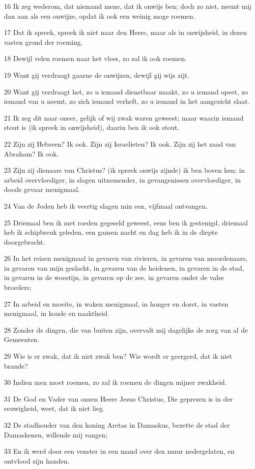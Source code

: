 \par 16 Ik zeg wederom, dat niemand mene, dat ik onwijs ben; doch zo niet, neemt mij dan aan als een onwijze, opdat ik ook een weinig moge roemen.
\par 17 Dat ik spreek, spreek ik niet naar den Heere, maar als in onwijsheid, in dezen vasten grond der roeming.
\par 18 Dewijl velen roemen naar het vlees, zo zal ik ook roemen.
\par 19 Want gij verdraagt gaarne de onwijzen, dewijl gij wijs zijt.
\par 20 Want gij verdraagt het, zo u iemand dienstbaar maakt, zo u iemand opeet, zo iemand van u neemt, zo zich iemand verheft, zo u iemand in het aangezicht slaat.
\par 21 Ik zeg dit naar oneer, gelijk of wij zwak waren geweest; maar waarin iemand stout is (ik spreek in onwijsheid), daarin ben ik ook stout.
\par 22 Zijn zij Hebreen? Ik ook. Zijn zij Israelieten? Ik ook. Zijn zij het zaad van Abraham? Ik ook.
\par 23 Zijn zij dienaars van Christus? (ik spreek onwijs zijnde) ik ben boven hen; in arbeid overvloediger, in slagen uitnemender, in gevangenissen overvloediger, in doods gevaar menigmaal.
\par 24 Van de Joden heb ik veertig slagen min een, vijfmaal ontvangen.
\par 25 Driemaal ben ik met roeden gegeseld geweest, eens ben ik gestenigd, driemaal heb ik schipbreuk geleden, een gansen nacht en dag heb ik in de diepte doorgebracht.
\par 26 In het reizen menigmaal in gevaren van rivieren, in gevaren van moordenaars, in gevaren van mijn geslacht, in gevaren van de heidenen, in gevaren in de stad, in gevaren in de woestijn, in gevaren op de zee, in gevaren onder de valse broeders;
\par 27 In arbeid en moeite, in waken menigmaal, in honger en dorst, in vasten menigmaal, in koude en naaktheid.
\par 28 Zonder de dingen, die van buiten zijn, overvalt mij dagelijks de zorg van al de Gemeenten.
\par 29 Wie is er zwak, dat ik niet zwak ben? Wie wordt er geergerd, dat ik niet brande?
\par 30 Indien men moet roemen, zo zal ik roemen de dingen mijner zwakheid.
\par 31 De God en Vader van onzen Heere Jezus Christus, Die geprezen is in der eeuwigheid, weet, dat ik niet lieg.
\par 32 De stadhouder van den koning Aretas in Damaskus, bezette de stad der Damaskenen, willende mij vangen;
\par 33 En ik werd door een venster in een mand over den muur nedergelaten, en ontvlood zijn handen.

